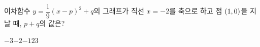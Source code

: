 이차함수 $y=\dfrac{1}{9}(x-p)^2+q$의 그래프가 직선 $x=-2$를 축으로 하고 점 $(1{,}\mkern3mu 0)$을 지날 때, $p+q$의 값은? 
\begin{choices32}{$-3$}{$-2$}{$-1$}{$2$}{$3$}\end{choices32}
